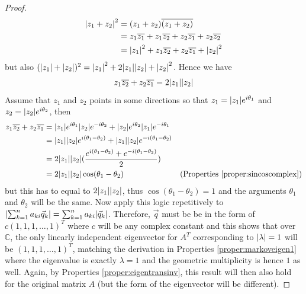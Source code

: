 \begin{proof}
{\begin{align*}
\abs{z_1 + z_2}^2 &= (z_1 + z_2) \overline{(z_1 + z_2)} \\
&= z_1 \overline{z_1} + z_1 \overline{z_2} + z_2 \overline{z_1} + z_2 \overline{z_2} \\
&= \abs{z_1}^2 + z_1 \overline{z_2} + z_2 \overline{z_1} + \abs{z_2}^2
\end{align*}
but also
$(\abs{z_1} + \abs{z_2})^2 = \abs{z_1}^2 + 2\abs{z_1}\abs{z_2} + \abs{z_2}^2$. Hence we have
\begin{align*}
z_1 \overline{z_2} + z_2 \overline{z_1} = 2\abs{z_1}\abs{z_2}
\end{align*}
\vspace{\maxdimen}Assume that $z_1$ and $z_2$ points in some directions so that $z_1 = \abs{z_1}e^{i\theta_1}$ and $z_2 = \abs{z_2}e^{i\theta_2}$, then
\begin{align*}
z_1 \overline{z_2} + z_2 \overline{z_1} &= \abs{z_1}e^{i\theta_1} \abs{z_2}e^{-i\theta_2} + \abs{z_2}e^{i\theta_2} \abs{z_1}e^{-i\theta_1} \\
&= \abs{z_1}\abs{z_2} e^{i(\theta_1-\theta_2)} + \abs{z_1}\abs{z_2} e^{-i(\theta_1-\theta_2)} \\
&= 2 \abs{z_1}\abs{z_2} (\frac{e^{i(\theta_1-\theta_2)} + e^{-i(\theta_1-\theta_2)}}{2}) \\
&= 2 \abs{z_1}\abs{z_2} \cos(\theta_1-\theta_2) & \text{(Properties \ref{proper:sincoscomplex})}
\end{align*}
but this has to equal to $2\abs{z_1}\abs{z_2}$, thus $\cos(\theta_1-\theta_2) = 1$ and the arguments $\theta_1$ and $\theta_2$ will be the same. Now apply this logic repetitively to $\abs{\sum_{k=1}^{n} a_{ki}\vec{q}_k} = \sum_{k=1}^{n} a_{ki}\abs{\vec{q}_k}$.} Therefore, $\vec{q}$ must be be in the form of $c(1,1,1,\ldots,1)^T$ where $c$ will be any complex constant and this shows that over $\mathbb{C}$, the only linearly independent eigenvector for $A^T$ corresponding to $\abs{\lambda} = 1$ will be $(1,1,1,\ldots,1)^T$, matching the derivation in Properties \ref{proper:markoveigen1} where the eigenvalue is exactly $\lambda = 1$ and the geometric multiplicity is hence $1$ as well. Again, by Properties \ref{proper:eigentransinv}, this result will then also hold for the original matrix $A$ (but the form of the eigenvector will be different).
\end{proof}
